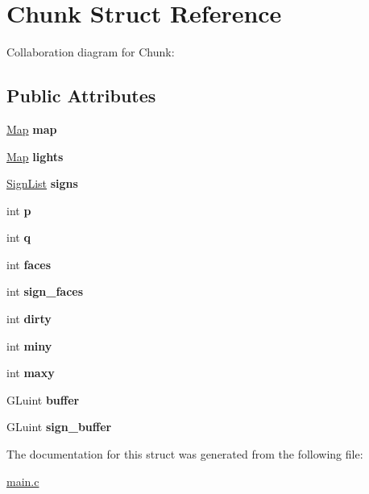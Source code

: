 \hypertarget{structChunk}{}\section{Chunk Struct Reference}
\label{structChunk}


Collaboration diagram for Chunk\+:
\subsection*{Public Attributes}
\begin{DoxyCompactItemize}
\item 
\mbox{\label{structChunk_ac925ff5f92406dea6f56044d7e1e2089}} 
\hyperlink{structMap}{Map} {\bfseries map}
\item 
\mbox{\label{structChunk_a5c3da6f37c20d1a9e4a6b128d9b4cfc2}} 
\hyperlink{structMap}{Map} {\bfseries lights}
\item 
\mbox{\label{structChunk_acd18dcf6bf17f499e36b5806519d8800}} 
\hyperlink{structSignList}{Sign\+List} {\bfseries signs}
\item 
\mbox{\label{structChunk_a016383084b50c856a1fb63f97ca63dc6}} 
int {\bfseries p}
\item 
\mbox{\label{structChunk_a20fb30e8ac307726320ef6d3e4cd89a1}} 
int {\bfseries q}
\item 
\mbox{\label{structChunk_aed1e3841c79fac84de3514739ca0ff0e}} 
int {\bfseries faces}
\item 
\mbox{\label{structChunk_a6ffdf89c012dfaefe531aa0eb93fe69a}} 
int {\bfseries sign\+\_\+faces}
\item 
\mbox{\label{structChunk_a67d8b303bbdb6b9928fec2783d08f59f}} 
int {\bfseries dirty}
\item 
\mbox{\label{structChunk_a528c51d2899b3f2d2c1fa8d7ef90621a}} 
int {\bfseries miny}
\item 
\mbox{\label{structChunk_a3745b0b938e79f1ee64eff354994994e}} 
int {\bfseries maxy}
\item 
\mbox{\label{structChunk_a37268084ae967da79d9e47033fcfd259}} 
G\+Luint {\bfseries buffer}
\item 
\mbox{\label{structChunk_a7c89d7fc29dbdd94c50280e92def013c}} 
G\+Luint {\bfseries sign\+\_\+buffer}
\end{DoxyCompactItemize}


The documentation for this struct was generated from the following file\+:\begin{DoxyCompactItemize}
\item 
\hyperlink{main_8c}{main.\+c}\end{DoxyCompactItemize}
